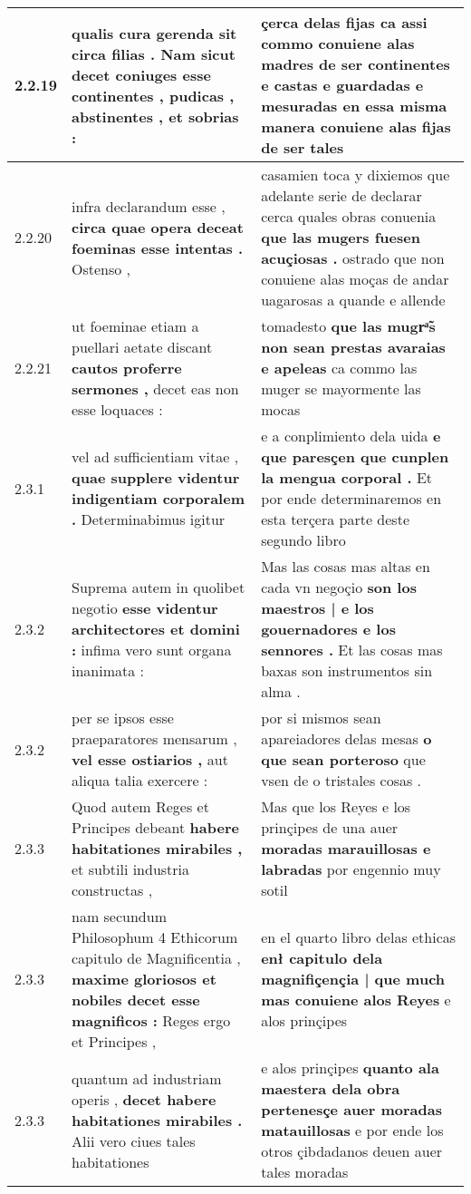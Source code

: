 \begin{tabular}{|p{1cm}|p{6.5cm}|p{6.5cm}|}
2.2.19 & qualis cura gerenda sit circa filias . \textbf{ Nam sicut decet coniuges esse continentes , } pudicas , abstinentes , et sobrias : & çerca delas fijas \textbf{ ca assi commo conuiene alas madres } de ser continentes e castas e guardadas e mesuradas en essa misma manera conuiene alas fijas de ser tales \\\hline
2.2.20 & infra declarandum esse , \textbf{ circa quae opera deceat foeminas esse intentas . } Ostenso , & casamien toca y dixiemos que adelante serie de declarar cerca quales obras conuenia \textbf{ que las mugers fuesen acuçiosas . } ostrado que non conuiene alas moças de andar uagarosas a quande e allende \\\hline
2.2.21 & ut foeminae etiam a puellari aetate discant \textbf{ cautos proferre sermones , } decet eas non esse loquaces : & tomadesto \textbf{ que las mugrͣ̃s non sean prestas avaraias e apeleas } ca commo las muger se mayormente las mocas \\\hline
2.3.1 & vel ad sufficientiam vitae , \textbf{ quae supplere videntur indigentiam corporalem . } Determinabimus igitur & e a conplimiento dela uida \textbf{ e que paresçen que cunplen la mengua corporal . } Et por ende determinaremos en esta terçera parte deste segundo libro \\\hline
2.3.2 & Suprema autem in quolibet negotio \textbf{ esse videntur architectores et domini : } infima vero sunt organa inanimata : & Mas las cosas mas altas en cada vn negoçio \textbf{ son los maestros | e los gouernadores e los sennores . } Et las cosas mas baxas son instrumentos sin alma . \\\hline
2.3.2 & per se ipsos esse praeparatores mensarum , \textbf{ vel esse ostiarios , } aut aliqua talia exercere : & por si mismos sean apareiadores delas mesas \textbf{ o que sean porteroso } que vsen de o tristales cosas . \\\hline
2.3.3 & Quod autem Reges et Principes debeant \textbf{ habere habitationes mirabiles , } et subtili industria constructas , & Mas que los Reyes e los prinçipes de una auer \textbf{ moradas marauillosas e labradas } por engennio muy sotil \\\hline
2.3.3 & nam secundum Philosophum 4 Ethicorum capitulo de Magnificentia , \textbf{ maxime gloriosos et nobiles decet esse magnificos : } Reges ergo et Principes , & en el quarto libro delas ethicas \textbf{ enł capitulo dela magnifiçençia | que much mas conuiene alos Reyes } e alos prinçipes \\\hline
2.3.3 & quantum ad industriam operis , \textbf{ decet habere habitationes mirabiles . } Alii vero ciues tales habitationes & e alos prinçipes \textbf{ quanto ala maestera dela obra pertenesçe auer moradas matauillosas } e por ende los otros çibdadanos deuen auer tales moradas \\\hline

\end{tabular}
